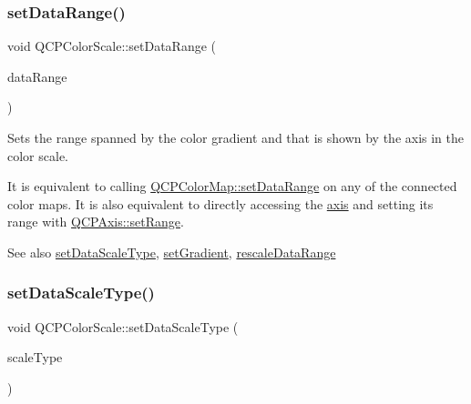 \subsubsection{\texorpdfstring{set\+Data\+Range()}{setDataRange()}}
{\footnotesize\ttfamily void Q\+C\+P\+Color\+Scale\+::set\+Data\+Range (\begin{DoxyParamCaption}\item[{const \mbox{\hyperlink{class_q_c_p_range}{Q\+C\+P\+Range}} \&}]{data\+Range }\end{DoxyParamCaption})}

Sets the range spanned by the color gradient and that is shown by the axis in the color scale.

It is equivalent to calling \mbox{\hyperlink{class_q_c_p_color_map_a980b42837821159786a85b4b7dcb8774}{Q\+C\+P\+Color\+Map\+::set\+Data\+Range}} on any of the connected color maps. It is also equivalent to directly accessing the \mbox{\hyperlink{class_q_c_p_color_scale_a39bdbdb3b212602a5a57f9f3ea444190}{axis}} and setting its range with \mbox{\hyperlink{class_q_c_p_axis_aebdfea5d44c3a0ad2b4700cd4d25b641}{Q\+C\+P\+Axis\+::set\+Range}}.

\begin{DoxySeeAlso}{See also}
\mbox{\hyperlink{class_q_c_p_color_scale_aeb6107d67dd7325145b2498abae67fc3}{set\+Data\+Scale\+Type}}, \mbox{\hyperlink{class_q_c_p_color_scale_a1f29583bb6f1e7f473b62fb712be3940}{set\+Gradient}}, \mbox{\hyperlink{class_q_c_p_color_scale_a425983db4478543924ddbd04ea20a356}{rescale\+Data\+Range}} 
\end{DoxySeeAlso}
\mbox{\label{class_q_c_p_color_scale_aeb6107d67dd7325145b2498abae67fc3}} 
\subsubsection{\texorpdfstring{set\+Data\+Scale\+Type()}{setDataScaleType()}}
{\footnotesize\ttfamily void Q\+C\+P\+Color\+Scale\+::set\+Data\+Scale\+Type (\begin{DoxyParamCaption}\item[{\mbox{\hyperlink{class_q_c_p_axis_a36d8e8658dbaa179bf2aeb973db2d6f0}{Q\+C\+P\+Axis\+::\+Scale\+Type}}}]{scale\+Type }\end{DoxyParamCaption})}

